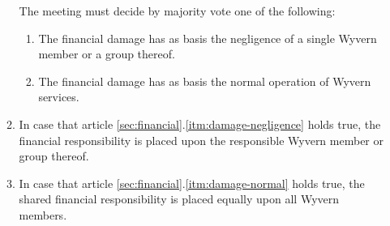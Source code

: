 \begin{enumerate}
\begin{item}
\begin{enumerate}
            \begin{item}
                The meeting must decide by majority vote one of the following:

                \begin{enumerate}
                    \item \label{itm:damage-negligence} The financial damage has as basis the negligence of a single Wyvern member or a group thereof.
                    \item \label{itm:damage-normal} The financial damage has as basis the normal operation of Wyvern services.
                \end{enumerate}
            \end{item}

            \item In case that article \ref{sec:financial}.\ref{itm:damage-negligence} holds true, the financial responsibility is placed upon the responsible Wyvern member or group thereof.

            \item In case that article \ref{sec:financial}.\ref{itm:damage-normal} holds true, the shared financial responsibility is placed equally upon all Wyvern members.
        \end{enumerate}

    \end{item}
\end{enumerate}
